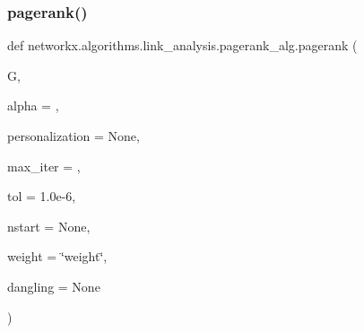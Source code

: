\subsubsection{\texorpdfstring{pagerank()}{pagerank()}}
{\footnotesize\ttfamily def networkx.\+algorithms.\+link\+\_\+analysis.\+pagerank\+\_\+alg.\+pagerank (\begin{DoxyParamCaption}\item[{}]{G,  }\item[{}]{alpha = {},  }\item[{}]{personalization = {\ttfamily None},  }\item[{}]{max\+\_\+iter = {},  }\item[{}]{tol = {\ttfamily 1.0e-\/6},  }\item[{}]{nstart = {\ttfamily None},  }\item[{}]{weight = {\ttfamily \char`\"{}weight\char`\"{}},  }\item[{}]{dangling = {\ttfamily None} }\end{DoxyParamCaption})}

